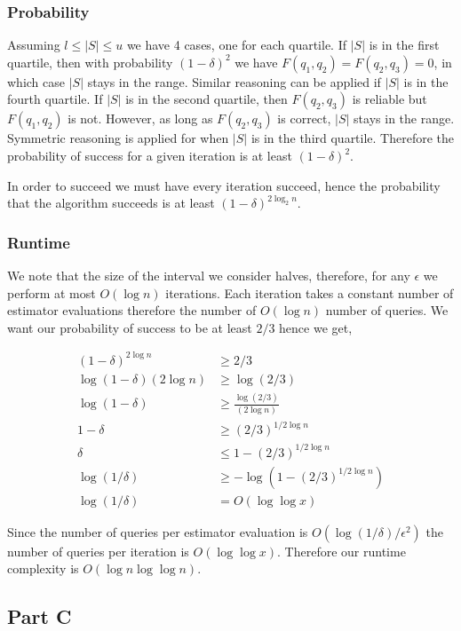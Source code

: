 \documentclass[a4paper]{article}
\def \eps{\epsilon}
\begin{document}
\subsubsection{Probability}

Assuming $l \leq |S| \leq u$ we have 4 cases, one for each quartile.
If $|S|$ is in the first quartile, then with probability $(1-\delta)^2$ we have $F(q_1, q_2) = F(q_2, q_3) = 0$,
in which case $|S|$ stays in the range. Similar reasoning can be applied if $|S|$ is in the fourth quartile.
If $|S|$ is in the second quartile, then $F(q_2, q_3)$ is reliable but $F(q_1, q_2)$ is not. However, as long as 
$F(q_2, q_3)$ is correct, $|S|$ stays in the range. Symmetric reasoning is applied for when $|S|$ is in the 
third quartile. Therefore the probability of success for a given iteration is at least $(1-\delta)^2$. 

In order to succeed we must have every iteration succeed, hence the probability that the algorithm succeeds is
at least $(1-\delta)^{2 \log_2 n}$.


\subsubsection{Runtime}

We note that the size of the interval we consider halves, therefore, for any $\eps$ we perform at most $O(\log n)$ iterations.
Each iteration takes a constant number of estimator evaluations therefore the number of $O(\log n)$ number of queries. We want our
probability of success to be at least $2/3$ hence we get,

\begin{align*}
	(1-\delta)^{2 \log n} &\geq 2/3\\
	\log (1-\delta) (2 \log n) &\geq \log (2/3)\\
	\log (1-\delta)  &\geq \frac{\log (2/3)}{(2 \log n)}\\
	1-\delta  &\geq (2/3)^{1/2 \log n}\\
	\delta  &\leq 1-(2/3)^{1/2 \log n}\\
	\log(1/\delta)  &\geq -\log(1-(2/3)^{1/2 \log n})\\
	\log(1/\delta)  &= O(\log \log x)
\end{align*}

Since the number of queries per estimator evaluation is $O(\log(1/\delta)/\eps^2)$  the number of queries
per iteration is $O(\log \log x)$. Therefore our runtime complexity is $O(\log n \log \log n)$.


\subsection{Part C}
\end{document}

